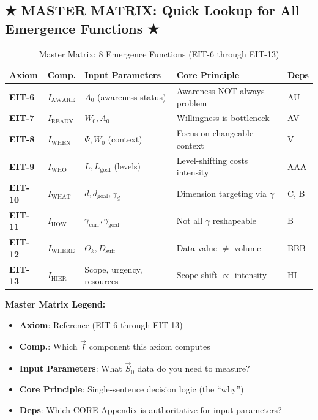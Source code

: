 \subsection{★ MASTER MATRIX: Quick Lookup for All Emergence Functions ★}

\begin{table}[htbp]
\centering
\caption{Master Matrix: 8 Emergence Functions (EIT-6 through EIT-13)}
\label{tab:ie-master-matrix}
\small
\renewcommand{\arraystretch}{1.4}
\begin{tabular}{@{}lp{1.2cm}p{2.8cm}p{3cm}p{1.8cm}@{}}
\toprule
\textbf{Axiom} & \textbf{Comp.} & \textbf{Input Parameters} & \textbf{Core Principle} & \textbf{Deps} \\
\midrule
\textbf{EIT-6} & $I_{\text{AWARE}}$ & $A_0$ (awareness status) & Awareness NOT always problem & AU \\
\textbf{EIT-7} & $I_{\text{READY}}$ & $W_0, A_0$ & Willingness is bottleneck & AV \\
\textbf{EIT-8} & $I_{\text{WHEN}}$ & $\Psi, W_0$ (context) & Focus on changeable context & V \\
\midrule
\textbf{EIT-9} & $I_{\text{WHO}}$ & $L, L_{\text{goal}}$ (levels) & Level-shifting costs intensity & AAA \\
\textbf{EIT-10} & $I_{\text{WHAT}}$ & $d, d_{\text{goal}}, \gamma_d$ & Dimension targeting via $\gamma$ & C, B \\
\textbf{EIT-11} & $I_{\text{HOW}}$ & $\gamma_{\text{curr}}, \gamma_{\text{goal}}$ & Not all $\gamma$ reshapeable & B \\
\textbf{EIT-12} & $I_{\text{WHERE}}$ & $\Theta_k, D_{\text{suff}}$ & Data value $\neq$ volume & BBB \\
\textbf{EIT-13} & $I_{\text{HIER}}$ & Scope, urgency, resources & Scope-shift $\propto$ intensity & HI \\
\bottomrule
\end{tabular}
\end{table}

\textbf{Master Matrix Legend:}
\begin{itemize}[nosep]
\item \textbf{Axiom}: Reference (EIT-6 through EIT-13)
\item \textbf{Comp.}: Which $\vec{I}$ component this axiom computes
\item \textbf{Input Parameters}: What $\vec{S}_0$ data do you need to measure?
\item \textbf{Core Principle}: Single-sentence decision logic (the ``why'')
\item \textbf{Deps}: Which CORE Appendix is authoritative for input parameters?
\end{itemize}


